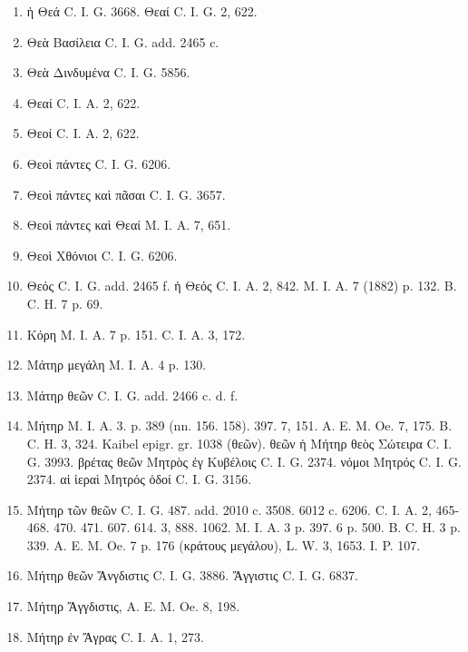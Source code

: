 \documentclass[a4paper, 11pt, oneside, polutonikogreek, german, twocolumn]{article}
\begin{document}
\begin{enumerate}
\item ἡ Θεά C. I. G. 3668. Θεαί C. I. G. 2, 622.

\item Θεὰ Βασίλεια C. I. G. add. 2465 c.

\item Θεὰ Δινδυμένα C. I. G. 5856.

\item Θεαί C. I. A. 2, 622.

\item Θεοί C. I. A. 2, 622.

\item Θεοὶ πάντες C. I. G. 6206.

\item Θεοὶ πάντες καὶ πᾶσαι C. I. G. 3657.

\item Θεοὶ πάντες καὶ Θεαί M. I. A. 7, 651.

\item Θεοὶ Χθόνιοι C. I. G. 6206.

\item Θεός C. I. G. add. 2465 f. ἡ Θεός C. I. A. 2, 842. M. I. A. 7 (1882) p. 132. B. C. H. 7 p. 69.

\item Κόρη M. I. A. 7 p. 151. C. I. A. 3, 172.

\item Μάτηρ μεγάλη M. I. A. 4 p. 130.

\item Μάτηρ θεῶν C. I. G. add. 2466 c. d. f.

\item Μήτηρ M. I. A. 3. p. 389 (nn. 156. 158). 397. 7, 151. A. E. M. Oe. 7, 175. B. C. H. 3, 324. Kaibel epigr. gr. 1038 (θεῶν). θεῶν ἡ Μήτηρ θεὸς Σώτειρα C. I. G. 3993. βρέτας θεῶν Μητρὸς ἐγ Κυβέλοις C. I. G. 2374. νόμοι Μητρός C. I. G. 2374. αἱ ἱεραὶ Μητρός ὁδοί C. I. G. 3156.

\item Μήτηρ τῶν θεῶν C. I. G. 487. add. 2010 c. 3508. 6012 c. 6206. C. I. A. 2, 465-468. 470. 471. 607. 614. 3, 888. 1062. M. I. A. 3 p. 397. 6 p. 500. B. C. H. 3 p. 339. A. E. M. Oe. 7 p. 176 (κράτους μεγάλου), L. W. 3, 1653. I. P. 107.

\item Μήτηρ θεῶν Ἄνγδιστις C. I. G. 3886. Ἄγγιστις C. I. G. 6837.

\item Μήτηρ Ἄγγδιστις, A. E. M. Oe. 8, 198.

\item Μήτηρ ἐν Ἄγρας C. I. A. 1, 273.


\end{enumerate}
\end{document}
